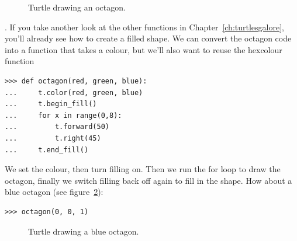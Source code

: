 \begin{figure}
\begin{center}
\end{center}
\caption{Turtle drawing an octagon.}\label{fig48}
\end{figure}

.  If you take another look at the other functions in Chapter~\ref{ch:turtlesgalore}, you'll already see how to create a filled shape. We can convert the octagon code into a function that takes a colour, but we'll also want to reuse the hexcolour function 

\begin{listing}
\begin{verbatim}
>>> def octagon(red, green, blue):
...     t.color(red, green, blue)
...     t.begin_fill()
...     for x in range(0,8):
...         t.forward(50)
...         t.right(45)
...     t.end_fill()
\end{verbatim}
\end{listing}

We set the colour, then turn filling on.  Then we run the for loop to draw the octagon, finally we switch filling back off again to fill in the shape. How about a blue octagon (see figure~\ref{fig49}):

\begin{listing}
\begin{verbatim}
>>> octagon(0, 0, 1)
\end{verbatim}
\end{listing}

\begin{figure}
\begin{center}
\end{center}
\caption{Turtle drawing a blue octagon.}\label{fig49}
\end{figure}
\newpage
